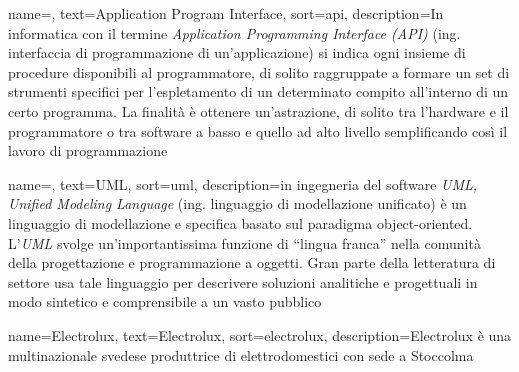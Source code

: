 



	
\renewcommand{\glossaryname}{Glossario}

{
    name=,
    text=Application Program Interface,
    sort=api,
    description={In informatica con il termine \emph{Application Programming Interface (API)} (ing. interfaccia di programmazione di un'applicazione) si indica ogni insieme di procedure disponibili al programmatore, di solito raggruppate a formare un set di strumenti specifici per l'espletamento di un determinato compito all'interno di un certo programma. La finalità è ottenere un'astrazione, di solito tra l'hardware e il programmatore o tra software a basso e quello ad alto livello semplificando così il lavoro di programmazione}
}

{
    name=,
    text=UML,
    sort=uml,
    description={in ingegneria del software \emph{UML, Unified Modeling Language} (ing. linguaggio di modellazione unificato) è un linguaggio di modellazione e specifica basato sul paradigma object-oriented. L'\emph{UML} svolge un'importantissima funzione di ``lingua franca'' nella comunità della progettazione e programmazione a oggetti. Gran parte della letteratura di settore usa tale linguaggio per descrivere soluzioni analitiche e progettuali in modo sintetico e comprensibile a un vasto pubblico}
}

{
	name={Electrolux},
	text=Electrolux,
	sort=electrolux,
	description={Electrolux è una multinazionale svedese produttrice di elettrodomestici con sede a Stoccolma}
}

